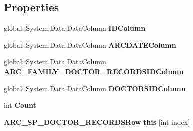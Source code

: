 \subsection*{Properties}
\begin{CompactItemize}
\item 
global::System.Data.DataColumn \textbf{IDColumn}\hspace{0.3cm}{\tt  [get]}\label{class_automatic_medical_system_1_1_data_set1_1_1_a_r_c___s_p___d_o_c_t_o_r___r_e_c_o_r_d_s_data_table_a90e5be02b25c799186579ab63fc0086}

\item 
global::System.Data.DataColumn \textbf{ARCDATEColumn}\hspace{0.3cm}{\tt  [get]}\label{class_automatic_medical_system_1_1_data_set1_1_1_a_r_c___s_p___d_o_c_t_o_r___r_e_c_o_r_d_s_data_table_4fdab951bbc81edb00bfa80d03d84ea7}

\item 
global::System.Data.DataColumn \textbf{ARC\_\-FAMILY\_\-DOCTOR\_\-RECORDSIDColumn}\hspace{0.3cm}{\tt  [get]}\label{class_automatic_medical_system_1_1_data_set1_1_1_a_r_c___s_p___d_o_c_t_o_r___r_e_c_o_r_d_s_data_table_75de18447a36cf1a87da7baa8e054d7b}

\item 
global::System.Data.DataColumn \textbf{DOCTORSIDColumn}\hspace{0.3cm}{\tt  [get]}\label{class_automatic_medical_system_1_1_data_set1_1_1_a_r_c___s_p___d_o_c_t_o_r___r_e_c_o_r_d_s_data_table_972e3622cdb7c9db890a50ce3b03e980}

\item 
int \textbf{Count}\hspace{0.3cm}{\tt  [get]}\label{class_automatic_medical_system_1_1_data_set1_1_1_a_r_c___s_p___d_o_c_t_o_r___r_e_c_o_r_d_s_data_table_3d3e41eb31ede2ee1515d4214e1ee714}

\item 
{\bf ARC\_\-SP\_\-DOCTOR\_\-RECORDSRow} \textbf{this} [int index]\hspace{0.3cm}{\tt  [get]}\label{class_automatic_medical_system_1_1_data_set1_1_1_a_r_c___s_p___d_o_c_t_o_r___r_e_c_o_r_d_s_data_table_64c9f3edc11eee712b04f7e725a79b53}

\end{CompactItemize}
